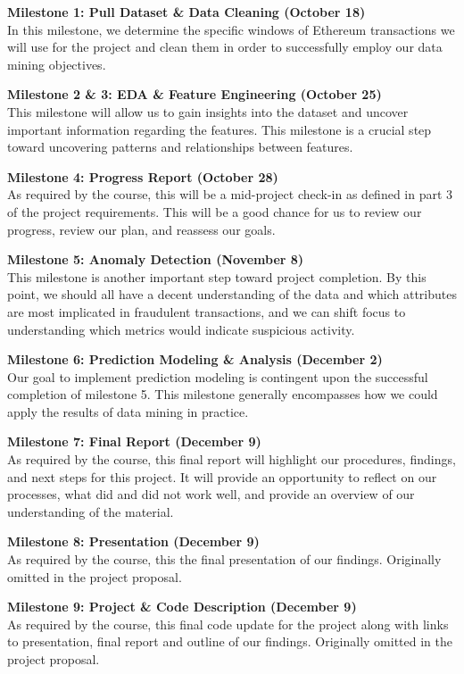 \documentclass[sigconf]{acmart}
\begin{document}
\textbf{Milestone 1: Pull Dataset \& Data Cleaning (October 18)}\\
In this milestone, we determine the specific windows of Ethereum transactions we will use for the project and clean them in order to successfully employ our data mining objectives.

\textbf{Milestone 2 \& 3: EDA \& Feature Engineering (October 25)}\\
This milestone will allow us to gain insights into the dataset and uncover important information regarding the features. This milestone is a crucial step toward uncovering patterns and relationships between features.

\textbf{Milestone 4: Progress Report (October 28)}\\
As required by the course, this will be a mid-project check-in as defined in part 3 of the project requirements. This will be a good chance for us to review our progress, review our plan, and reassess our goals.

\textbf{Milestone 5: Anomaly Detection (November 8)}\\
This milestone is another important step toward project completion. By this point, we should all have a decent understanding of the data and which attributes are most implicated in fraudulent transactions, and we can shift focus to understanding which metrics would indicate suspicious activity.

\textbf{Milestone 6: Prediction Modeling \& Analysis (December 2)}\\
Our goal to implement prediction modeling is contingent upon the successful completion of milestone 5. This milestone generally encompasses how we could apply the results of data mining in practice.

\textbf{Milestone 7: Final Report (December 9)}\\
As required by the course, this final report will highlight our procedures, findings, and next steps for this project. It will provide an opportunity to reflect on our processes, what did and did not work well, and provide an overview of our understanding of the material.


\textbf{Milestone 8: Presentation (December 9)}\\
As required by the course, this the final presentation of our findings. Originally omitted in the project proposal.

\textbf{Milestone 9: Project \& Code Description (December 9)}\\
As required by the course, this final code update for the project along with links to presentation, final report and outline of our findings. Originally omitted in the project proposal. 
\end{document}
